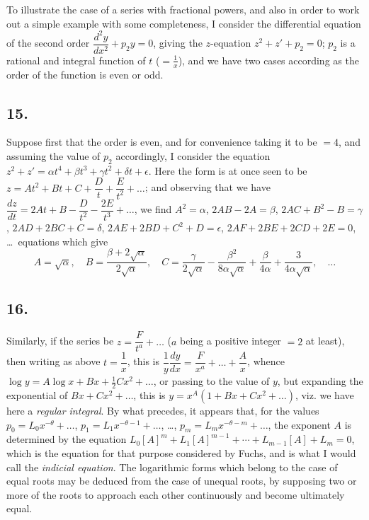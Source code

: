 \documentclass[11pt,a4paper]{article}
\theoremstyle{definition}
\begin{document}
To illustrate the case of a series with fractional powers, and also in order to work out a simple example with some completeness, I consider the differential equation of the second order $\dfrac{d^2y}{dx^2} + p_2 y = 0$, giving the $z$-equation $z^2 + z' + p_2 = 0$; $p_2$ is a rational and integral function of $t$ ($= \frac{1}{x}$), and we have two cases according as the order of the function is even or odd.

\subsection*{15.}

Suppose first that the order is even, and for convenience taking it to be $= 4$, and assuming the value of $p_2$ accordingly, I consider the equation $z^2 + z' = \alpha t^4 + \beta t^3 + \gamma t^2 + \delta t + \epsilon$. Here the form is at once seen to be $z = At^2 + Bt + C + \dfrac{D}{t} + \dfrac{E}{t^2} + \ldots$; and observing that we have $\dfrac{dz}{dt} = 2At + B - \dfrac{D}{t^2} - \dfrac{2E}{t^3} + \ldots$, we find $A^2 = \alpha$, $2AB - 2A = \beta$, $2AC + B^2 - B = \gamma$, $2AD + 2BC + C = \delta$, $2AE + 2BD + C^2 + D = \epsilon$, $2AF + 2BE + 2CD + 2E = 0$, \ldots\ equations which give
\[
A = \sqrt{\alpha}, \quad B = \frac{\beta + 2\sqrt{\alpha}}{2\sqrt{\alpha}}, \quad C = \frac{\gamma}{2\sqrt{\alpha}} - \frac{\beta^2}{8\alpha\sqrt{\alpha}} + \frac{\beta}{4\alpha} + \frac{3}{4\alpha\sqrt{\alpha}}, \quad \ldots
\]

\subsection*{16.}

Similarly, if the series be $z = \dfrac{F}{t^a} + \ldots$ ($a$ being a positive integer $= 2$ at least), then writing as above $t = \dfrac{1}{x}$, this is $\dfrac{1}{y}\dfrac{dy}{dx} = \dfrac{F}{x^a} + \ldots + \dfrac{A}{x}$, whence $\log y = A \log x + Bx + \tfrac{1}{2}Cx^2 + \ldots$, or passing to the value of $y$, but expanding the exponential of $Bx + Cx^2 + \ldots$, this is $y = x^A(1 + Bx + Cx^2 + \ldots)$, viz. we have here a \textit{regular integral}. By what precedes, it appears that, for the values $p_0 = L_0 x^{-\theta} + \ldots$, $p_1 = L_1 x^{-\theta - 1} + \ldots$, \ldots, $p_m = L_m x^{-\theta - m} + \ldots$, the exponent $A$ is determined by the equation $L_0 [A]^m + L_1 [A]^{m-1} + \cdots + L_{m-1}[A] + L_m = 0$, which is the equation for that purpose considered by Fuchs, and is what I would call the \textit{indicial equation}. The logarithmic forms which belong to the case of equal roots may be deduced from the case of unequal roots, by supposing two or more of the roots to approach each other continuously and become ultimately equal.
\end{document}
